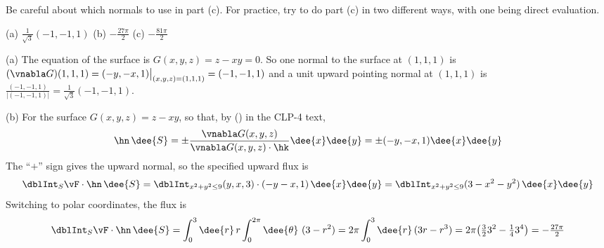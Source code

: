 \begin{hint} 
Be careful about which normals to use in part (c). For practice, try to do 
part (c) in two different ways, with one being direct evaluation.
\end{hint}

\begin{answer} 
(a) $\frac{1}{\sqrt{3}}(-1,-1,1)$\qquad
(b) $-\tfrac{27\pi}{2}$\qquad
(c) $-\tfrac{81\pi}{2}$
\end{answer}

\begin{solution}  (a)
The equation of the surface is $G(x,y,z)=z-xy=0$. So one normal to the
surface at $(1,1,1)$ is $(\vnabla G)(1,1,1)=(-y,-x,1)\big|_{(x,y,z)=(1,1,1)}
=(-1,-1,1)$ and a unit upward pointing normal at $(1,1,1)$ is
$\frac{(-1,-1,1)}{|(-1,-1,1)|}=\frac{1}{\sqrt{3}}(-1,-1,1)$.


\noindent (b)
For the surface $G(x,y,z)=z-xy$, so that, by ()
in the CLP-4 text,
\begin{align*}
\hn\,\dee{S} =\pm\frac{\vnabla G(x,y,z)}{\vnabla G(x,y,z)\cdot\hk}\dee{x}\dee{y}
=\pm (-y,-x,1) \dee{x}\dee{y}
\end{align*}
The ``$+$'' sign gives the upward normal, so the specified upward flux is
\begin{align*}
\dblInt_S \vF\cdot\hn\,\dee{S}
=\dblInt_{x^2+y^2\le 9} (y,x,3)\cdot (-y-x,1)\,\dee{x}\dee{y}
=\dblInt_{x^2+y^2\le 9} (3-x^2-y^2)\,\dee{x}\dee{y}
\end{align*}
Switching to polar coordinates, the flux is
\begin{align*}
\dblInt_S \vF\cdot\hn\,\dee{S}
=\int_0^3\dee{r}\,r\int_0^{2\pi}\dee{\theta}\ (3-r^2)
=2\pi \int_0^3 \dee{r}\, (3r-r^3)
=2\pi \big(\tfrac{3}{2}3^2-\tfrac{1}{4}3^4\big)
=-\tfrac{27\pi}{2}
\end{align*}


\end{solution}

